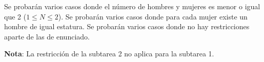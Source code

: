 \documentclass{oci}
\begin{document}
\begin{scoreDescription}
   Se probarán varios casos donde el número de hombres y mujeres es menor o igual que 2 ($1 \leq N \leq 2$).
   Se probarán varios casos donde para cada mujer existe un hombre de igual estatura.
   Se probarán varios casos donde no hay restricciones aparte de las de enunciado.

\textbf{Nota}: La restricción de la subtarea 2 no aplica para la subtarea 1.
\end{scoreDescription}

\begin{sampleDescription}
\end{sampleDescription}
\end{document}
